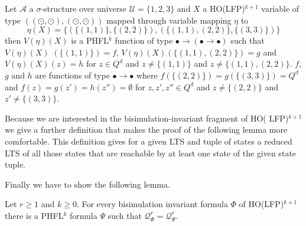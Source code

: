 \begin{example}
    Let $\mathcal{A}$ a $\sigma$-structure over universe $\mathcal{U} = \{1, 2, 3\}$ and $X$ a HO(LFP)$^{k + 1}$
    variable of type $((\odot, \odot), (\odot, \odot))$ mapped through variable mapping $\eta$ to
    \[\eta(X) = \{(\{(1, 1)\}, \{(2, 2)\}), (\{(1, 1), (2, 2)\}, \{(3, 3)\})\}\]
    then $V(\eta)(X)$ is a PHFL$^k$ function of type $\bullet \rightarrow (\bullet \rightarrow \bullet)$ such
    that $V(\eta)(X)$ $(\{(1, 1)\}) = f$, $V(\eta)(X)(\{(1, 1), (2, 2)\}) = g$ and $V(\eta)(X)(z) = h$ for $z \in
    Q^d$ and $z \neq \{(1, 1)\}$ and $z \neq \{(1, 1), (2, 2)\}$. $f$, $g$ and $h$ are functions of type $\bullet
    \rightarrow \bullet$ where $f(\{(2, 2)\}) = g(\{(3, 3)\}) = Q^d$ and $f(z) = g(z') = h(z'') = \emptyset$ for $z,
    z', z'' \in Q^d$ and $z \neq \{(2, 2)\}$ and $z' \neq \{(3, 3)\}$.
\end{example}

Because we are interested in the bisimulation-invariant fragment of HO( LFP)$^{k+1}$ we give a further definition that
makes the proof of the following lemma more comfortable. This definition gives for a given LTS and tuple of states a
reduced LTS of all those states that are reachable by at least one state of the given state tuple.

Finally we have to show the following lemma.

\begin{lemma}
    \label{lemma:ho_lfp_equals_phfl}
    Let $r \geq 1$ and $k \geq 0$. For every bisimulation invariant formula $\Phi$ of HO(LFP)$^{k + 1}$ there is a
    PHFL$^k$ formula $\Psi$ such that $\mathcal{Q}_\Phi^r = \mathcal{Q}_\Psi^r$.
\end{lemma}

